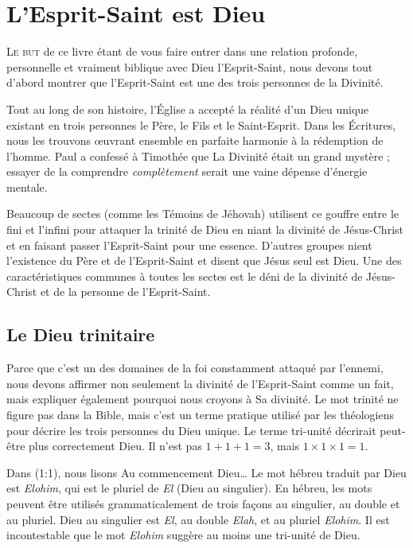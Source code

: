 \chapter{L'Esprit-Saint est Dieu}

\lettrine{L}{e but} de ce livre étant de vous faire entrer
 dans une relation profonde, personnelle et vraiment biblique avec
 Dieu l'Esprit-Saint, nous devons tout d'abord montrer que l'Esprit-Saint
 est une des trois personnes de la Divinité.

Tout au long de son histoire, l'Église a accepté la réalité d'un Dieu unique
 existant en trois personnes\frcolon{} le Père, le Fils et le Saint-Esprit.
 Dans les Écritures, nous les trouvons \oe{}uvrant ensemble en parfaite harmonie
 à la rédemption de l'homme.
 Paul a confessé à Timothée que La Divinité était un grand mystère ;
 essayer de la comprendre \emph{complètement} serait une vaine dépense
 d'énergie mentale.

Beaucoup de sectes (comme les Témoins de Jéhovah) utilisent
 ce gouffre entre le fini et l'infini pour attaquer la trinité de Dieu
 en niant la divinité de Jésus-Christ et en faisant passer l'Esprit-Saint
 pour une essence. D'autres groupes nient l'existence du Père et
 de l'Esprit-Saint et disent que Jésus seul est Dieu.
 Une des caractéristiques communes à toutes les sectes est le déni de la divinité
 de Jésus-Christ et de la personne de l'Esprit-Saint.

\section{Le Dieu trinitaire}

Parce que c'est un des domaines de la foi constamment attaqué par l'ennemi, nous devons
 affirmer non seulement la divinité de l'Esprit-Saint comme un fait,
 mais expliquer également pourquoi nous croyons à Sa divinité.
 Le mot \Og trinité \Fg{} ne figure pas dans la Bible, mais c'est un
 terme pratique utilisé par les théologiens pour décrire les trois personnes
 du Dieu unique.
 Le terme \Og tri-unité \Fg{} décrirait peut-être plus correctement Dieu.
 Il n'est pas $1 + 1 + 1 = 3$, mais $1 \times 1 \times 1 = 1$.

Dans (1:1), nous lisons\frcolon{}
 \Og Au commencement Dieu\dots{} \Fg{}
 Le mot hébreu traduit par \Og Dieu \Fg{} est \emph{Elohim}, qui est
 le pluriel de \emph{El} (Dieu au singulier).
 En hébreu, les mots peuvent être utilisés grammaticalement de trois
 façons\frcolon{} au singulier, au \Og double \Fg{} et au pluriel.
 \Og Dieu \Fg{} au singulier est \emph{El}, au double \emph{Elah},
 et au pluriel \emph{Elohim}.
 Il est incontestable que le mot \emph{Elohim} suggère au moins
 une tri-unité de Dieu.

